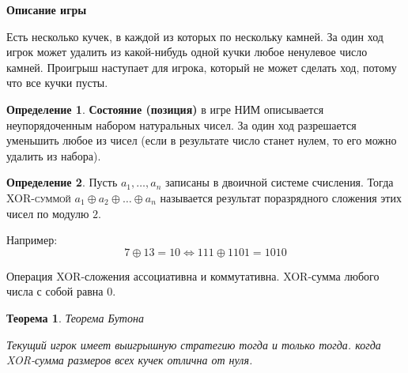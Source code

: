 \documentclass[aps,%
12pt,%
final,%
oneside,
onecolumn,%
musixtex, %
superscriptaddress,%
centertags]{article} %
\theoremstyle{plain}
\newtheorem{theorem}{Теорема}[section] %
\theoremstyle{definition}
\newtheorem{definition}{Определение}[subsection]
\theoremstyle{remark}
\begin{document}
\textbf{Описание игры}

Есть несколько кучек, в каждой из которых по нескольку камней. За один ход игрок может удалить из какой-нибудь одной кучки любое ненулевое число камней. Проигрыш наступает для игрока, который не может сделать ход, потому что все кучки пусты.

\begin{definition}
  \textbf{Состояние (позиция)} в игре НИМ описывается неупорядоченным набором натуральных чисел. За один ход разрешается уменьшить любое из чисел (если в результате число станет нулем, то его можно удалить из набора).
\end{definition}

\begin{definition}
  Пусть $a_1,\ldots,a_n$ записаны в двоичной системе счисления. Тогда \textsc{XOR-суммой} $a_1 \oplus a_2 \oplus \ldots \oplus a_n$ называется результат поразрядного сложения этих чисел по модулю $2$.

  Например:
  $$7 \oplus 13 = 10 \Leftrightarrow 111 \oplus 1101 = 1010$$

  Операция \textsc{XOR}-сложения ассоциативна и коммутативна. \textsc{XOR}-сумма любого числа с собой равна $0$.
\end{definition}

\begin{theorem}
  Теорема Бутона

  Текущий игрок имеет выигрышную стратегию тогда и только тогда. когда \textsc{XOR}-сумма размеров всех кучек отлична от нуля.
\end{theorem}
\end{document}
